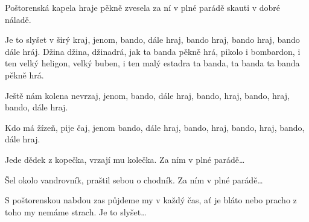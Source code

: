 
\beginverse{}
Poštorenská kapela hraje pěkně zvesela
za ní v plné parádě skauti v dobré náladě.
\endverse{}

\beginchorus{}
Je to slyšet v širý kraj, jenom, bando, dále hraj,
bando hraj, bando hraj, bando dále hráj.
Džina džina, džinadrá, jak ta banda pěkně hrá,
pikolo i bombardon, i ten velký heligon,
velký buben, i ten malý estadra
ta banda, ta banda ta banda pěkně hrá.
\endchorus{}

\beginverse{}
\chordsoff{}
Ještě nám kolena nevrzaj, jenom, bando, dále hraj, bando, hraj, bando, hraj, bando, dále hraj.
\chordson{}
\endverse{}

\beginverse{}
\chordsoff{}
Kdo má žízeň, pije čaj, jenom bando, dále hraj, bando, hraj, bando, hraj, bando, dále hraj.
\chordson{}
\endverse{}

\beginverse{}
\chordsoff{}
Jede dědek z kopečka, vrzají mu kolečka. Za ním v plné parádě\ldots{}
\chordson{}
\endverse{}

\beginverse{}
\chordsoff{}
Šel okolo vandrovník, praštil sebou o chodník. Za ním v plné parádě\ldots{}
\chordson{}
\endverse{}

\beginverse{}
\chordsoff{}
S poštorenskou nabdou zas půjdeme my v každý čas, ať je bláto nebo pracho z toho my nemáme strach. Je to slyšet\ldots{}
\chordson{}
\endverse{}

\endsong{}
